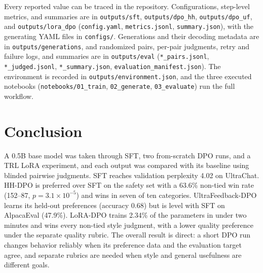 \documentclass{article}
\newcommand{\pct}{\%\xspace}
\newcommand{\code}[1]{\texttt{#1}}
\begin{document}
{\sloppy Every reported value can be traced in the repository. Configurations, step-level metrics, and summaries are in \code{outputs/sft}, \code{outputs/dpo\_hh}, \code{outputs/dpo\_uf}, and \code{outputs/lora\_dpo} (\code{config.yaml}, \code{metrics.jsonl}, \code{summary.json}), with the generating YAML files in \code{configs/}. Generations and their decoding metadata are in \code{outputs/generations}, and randomized pairs, per-pair judgments, retry and failure logs, and summaries are in \code{outputs/eval} (\code{*\_pairs.jsonl}, \code{*\_judged.jsonl}, \code{*\_summary.json}, \code{evaluation\_manifest.json}). The environment is recorded in \code{outputs/environment.json}, and the three executed notebooks (\code{notebooks/01\_train}, \code{02\_generate}, \code{03\_evaluate}) run the full workflow.}

\section{Conclusion}

A 0.5B base model was taken through SFT, two from-scratch DPO runs, and a TRL LoRA experiment, and each output was compared with its baseline using blinded pairwise judgments. SFT reaches validation perplexity 4.02 on UltraChat. HH-DPO is preferred over SFT on the safety set with a 63.6\pct non-tied win rate (152--87, $p=3.1\times10^{-5}$) and wins in seven of ten categories. UltraFeedback-DPO learns its held-out preferences (accuracy 0.68) but is level with SFT on AlpacaEval (47.9\pct). LoRA-DPO trains 2.34\pct of the parameters in under two minutes and wins every non-tied style judgment, with a lower quality preference under the separate quality rubric. The overall result is direct: a short DPO run changes behavior reliably when its preference data and the evaluation target agree, and separate rubrics are needed when style and general usefulness are different goals.
\end{document}
